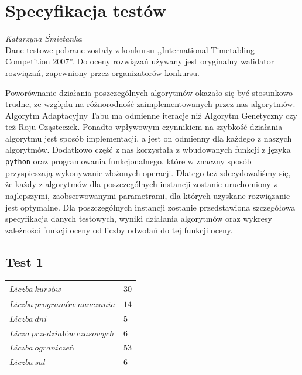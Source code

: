 \section{Specyfikacja testów}
\textit{Katarzyna Śmietanka} 
\\
Dane testowe pobrane zostały z konkursu ,,International Timetabling Competition 2007''. Do oceny rozwiązań używany jest oryginalny walidator rozwiązań, zapewniony przez organizatorów konkursu.
\par Poworównanie działania poszczególnych algorytmów okazało się być stosunkowo trudne, ze względu na różnorodność zaimplementowanych przez nas algorytmów. Algorytm Adaptacyjny Tabu ma odmienne iteracje niż Algorytm Genetyczny czy też Roju Cząsteczek. Ponadto wpływowym czynnikiem na szybkość działania algorytmu jest sposób implementacji, a jest on odmienny dla każdego z naszych algorytmów. Dodatkowo część z nas korzystała z wbudowanych funkcji z języka \verb#python# oraz programowania funkcjonalnego, które w znaczny sposób przyspieszają wykonywanie złożonych operacji. Dlatego też zdecydowaliśmy się, że każdy z algorytmów dla poszczególnych instancji zostanie uruchomiony z najlepszymi, zaobserwowanymi parametrami, dla których uzyskane rozwiązanie jest optymalne. Dla poszczególnych instancji zostanie przedstawiona szczegółowa specyfikacja danych testowych, wyniki działania algorytmów oraz wykresy zależności funkcji oceny od liczby odwołań do tej funkcji oceny.
\subsection{Test 1}
\begin{table}[H]
\begin{center}
 
\begin{tabular}{ |l|l| }
\hline
$Liczba\ kursów$ & $30$\\
\hline
$Liczba\ programów\ nauczania$ & $14$\\
\hline
$Liczba\ dni$ & $5$ \\
\hline
$Licza\ przedziałów\ czasowych$ & $6$ \\
\hline
$Liczba\ ograniczeń$ & $53$ \\
\hline
$Liczba\ sal$ & $6$ \\
\hline
\end{tabular}
\end{center}
\end{table}


